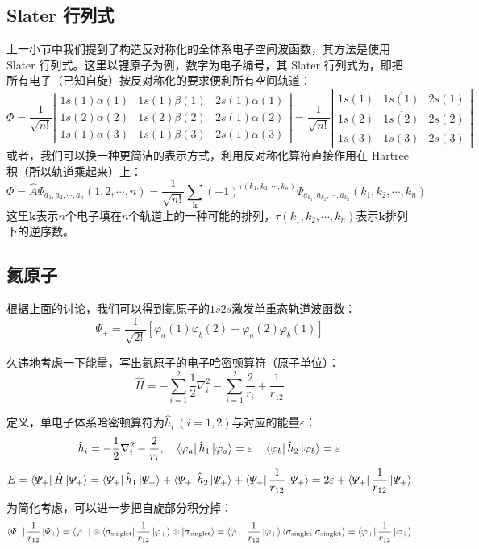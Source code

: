 \subsection{Slater 行列式}
上一小节中我们提到了构造反对称化的全体系电子空间波函数，其方法是使用 Slater 行列式。这里以锂原子为例，数字为电子编号，其 Slater 行列式为，即把所有电子（已知自旋）按反对称化的要求便利所有空间轨道：
\[\varPhi=\frac{1}{\sqrt{n!}}
\left |
\begin{array}{lll}
1s(1)\alpha(1) & 1s(1)\beta(1) & 2s(1)\alpha(1) \\
1s(2)\alpha(2) & 1s(2)\beta(2) & 2s(1)\alpha(2) \\
1s(1)\alpha(3) & 1s(1)\beta(3) & 2s(1)\alpha(3)
\end{array}
\right |
=\frac{1}{\sqrt{n!}}
\left |
\begin{array}{lll}
1s(1) & \overline{1s(1)} & 2s(1) \\
1s(2) & \overline{1s(2)} & 2s(2) \\
1s(3) & \overline{1s(3)} & 2s(3)
\end{array}
\right |
\]
或者，我们可以换一种更简洁的表示方式，利用反对称化算符直接作用在 Hartree 积（所以轨道乘起来）上：
\[\varPhi=\hat{A}\varPsi_{a_1,a_2,\cdots,a_n}(1,2,\cdots,n)=\frac{1}{\sqrt{n!}}\sum_{\bm{k}}(-1)^{\tau(k_1,k_2,\cdots,k_n)}\varPsi_{a_{k_1},a_{k_2},\cdots,a_{k_n}}(k_1,k_2,\cdots,k_n)\]
这里$\bm{k}$表示$n$个电子填在$n$个轨道上的一种可能的排列，$\tau(k_1,k_2,\cdots,k_n)$表示$\bm{k}$排列下的逆序数。
\subsection{氦原子}
根据上面的讨论，我们可以得到氦原子的$1s2s$激发单重态轨道波函数：
\[\varPsi_{+}=\frac{1}{\sqrt{2!}}[\varphi_a(1)\varphi_b(2)+\varphi_a(2)\varphi_b(1)]\]

久违地考虑一下能量，写出氦原子的电子哈密顿算符（原子单位）：
\[\hat{H}=-\sum_{i=1}^2\frac{1}{2}\nabla^2_i-\sum_{i=1}^2\frac{2}{r_{i}}+\frac{1}{r_{12}}\]

定义，单电子体系哈密顿算符为$\hat{h}_i \ (i=1,2)$与对应的能量$\varepsilon$：
\[\hat{h}_i=-\frac{1}{2}\nabla^2_i-\frac{2}{r_{i}}, \quad \bra{\varphi_a}\hat{h}_1\ket{\varphi_a}=\varepsilon \quad \bra{\varphi_b}\hat{h}_2\ket{\varphi_b}=\varepsilon\]
\[E=\bra{\varPsi_{+}}\hat{H}\ket{\varPsi_{+}}=\bra{\varPsi_{+}}\hat{h}_1\ket{\varPsi_{+}}+\bra{\varPsi_{+}}\hat{h}_2\ket{\varPsi_{+}}+\bra{\varPsi_{+}}\frac{1}{r_{12}}\ket{\varPsi_{+}}=2\varepsilon+\bra{\varPsi_{+}}\frac{1}{r_{12}}\ket{\varPsi_{+}}\]
为简化考虑，可以进一步把自旋部分积分掉：
\[\bra{\varPsi_{+}}\frac{1}{r_{12}}\ket{\varPsi_{+}}=\bra{\varphi_{+}}\otimes\bra{\sigma_{\rm{singlet}}}\frac{1}{r_{12}}\ket{\varphi_{+}}\otimes\ket{\sigma_{\rm{singlet}}}=\bra{\varphi_{+}}\frac{1}{r_{12}}\ket{\varphi_{+}}\bra{\sigma_{\rm{singlet}}}\ket{\sigma_{\rm{singlet}}}=\bra{\varphi_{+}}\frac{1}{r_{12}}\ket{\varphi_{+}}\]

